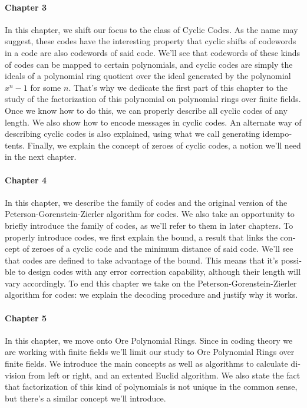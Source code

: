 \begin{otherlanguage}{english}
\paragraph{Chapter 3} In this chapter, we shift our focus to the class of Cyclic Codes. 
As the name may suggest, these codes have the interesting property that cyclic shifts of codewords in a code are also codewords of said code.
We'll see that codewords of these kinds of codes can be mapped to certain polynomials, and cyclic codes are simply the ideals of a polynomial ring quotient over the ideal generated by the polynomial \(x^n - 1\) for some \(n\).
That's why we dedicate the first part of this chapter to the study of the factorization of this polynomial on polynomial rings over finite fields.
Once we know how to do this, we can properly describe all cyclic codes of any length.
We also show how to encode messages in cyclic codes.
An alternate way of describing cyclic codes is also explained, using what we call generating idempotents.
Finally, we explain the concept of zeroes of cyclic codes, a notion we'll need in the next chapter.

\paragraph{Chapter 4} In this chapter, we describe the family of  codes and the original version of the Peterson-Gorenstein-Zierler algorithm for  codes.
We also take an opportunity to briefly introduce the family of  codes, as we'll refer to them in later chapters.
To properly introduce  codes, we first explain the  bound, a result that links the concept of zeroes of a cyclic code and the minimum distance of said code.
We'll see that  codes are defined to take advantage of the  bound.
This means that it's possible to design  codes with any error correction capability, although their length will vary accordingly.
To end this chapter we take on the Peterson-Gorenstein-Zierler algorithm for  codes: we explain the decoding procedure and justify why it works.

\paragraph{Chapter 5} In this chapter, we move onto Ore Polynomial Rings.
Since in coding theory we are working with finite fields we'll limit our study to Ore Polynomial Rings over finite fields.
We introduce the main concepts as well as algorithms to calculate division from left or right, and an extented Euclid algorithm.
We also state the fact that factorization of this kind of polynomials is not unique in the common sense, but there's a similar concept we'll introduce.


\end{otherlanguage}
